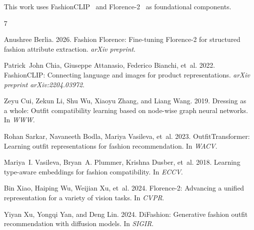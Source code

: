 \documentclass[sigconf]{acmart}
\begin{document}
\begin{acks}
This work uses FashionCLIP~\cite{chia2022fashionclip} and
Florence-2~\cite{xiao2024florence} as foundational components.
\end{acks}


\begin{thebibliography}{7}

Anushree Berlia. 2026. Fashion Florence: Fine-tuning Florence-2 for
structured fashion attribute extraction. \emph{arXiv preprint}.

Patrick~John Chia, Giuseppe Attanasio, Federico Bianchi, et~al. 2022.
FashionCLIP: Connecting language and images for product representations.
\emph{arXiv preprint arXiv:2204.03972}.

Zeyu Cui, Zekun Li, Shu Wu, Xiaoyu Zhang, and Liang Wang. 2019.
Dressing as a whole: Outfit compatibility learning based on node-wise
graph neural networks. In \emph{WWW}.

Rohan Sarkar, Navaneeth Bodla, Mariya Vasileva, et~al. 2023.
OutfitTransformer: Learning outfit representations for fashion
recommendation. In \emph{WACV}.

Mariya~I. Vasileva, Bryan~A. Plummer, Krishna Dusber, et~al. 2018.
Learning type-aware embeddings for fashion compatibility. In \emph{ECCV}.

Bin Xiao, Haiping Wu, Weijian Xu, et~al. 2024. Florence-2: Advancing a
unified representation for a variety of vision tasks. In \emph{CVPR}.

Yiyan Xu, Yongqi Yan, and Deng Lin. 2024.
DiFashion: Generative fashion outfit recommendation with diffusion
models. In \emph{SIGIR}.

\end{thebibliography}
\end{document}
